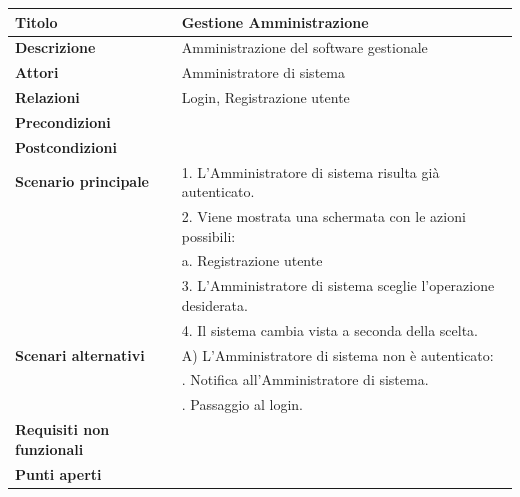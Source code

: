 \documentclass[a4paper]{article}
\begin{document}

\begin{center}
\begin{tabularx}{1\textwidth}{|l|X|}
    \hline
	\textbf{Titolo} & Gestione Amministrazione \\
	\hline
	\textbf{Descrizione} & Amministrazione del software gestionale \\
	\hline
	\textbf{Attori} & Amministratore di sistema \\
	\hline
	\textbf{Relazioni} & Login, Registrazione utente \\
	\hline
	\textbf{Precondizioni} &  \\
	\hline
	\textbf{Postcondizioni} &  \\
	\hline
	\textbf{Scenario principale} & 1. L'Amministratore di sistema risulta già autenticato.\\
	                             & 2. Viene mostrata una schermata con le azioni possibili:\\
								 & \quad a. Registrazione utente\\
								 & 3. L'Amministratore di sistema sceglie l'operazione desiderata.\\
								 & 4. Il sistema cambia vista a seconda della scelta.\\
	\hline
	\textbf{Scenari alternativi} & A) L'Amministratore di sistema non è autenticato: \\
								 & \quad 1. Notifica all'Amministratore di sistema.\\
								 & \quad 2. Passaggio al login.\\
	\hline
	\textbf{Requisiti non funzionali} & \\
	\hline
	\textbf{Punti aperti} & \\
	\hline
\end{tabularx}
\end{center}


\end{document}
